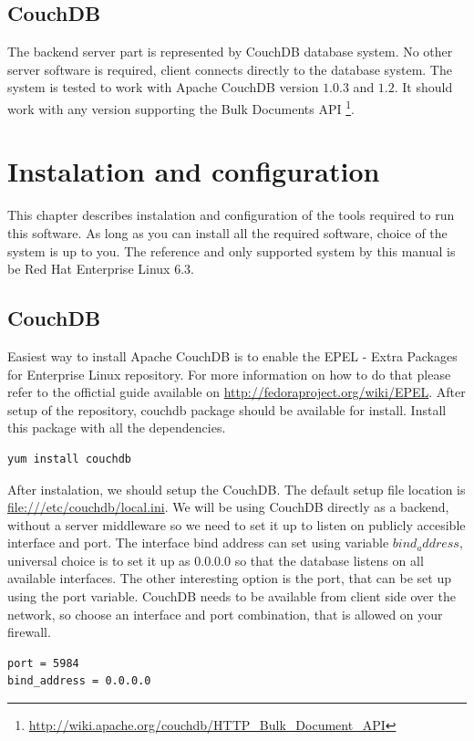 \documentclass[10pt,a4paper,oneside]{report}
\begin{document}
\section{CouchDB}
The backend server part is represented by CouchDB database system. No other
server software is required, client connects directly to the database system.
The system is tested to work with Apache CouchDB version $1.0.3$ and $1.2$. It
should work with any version supporting the Bulk Documents API
\footnote{\url{http://wiki.apache.org/couchdb/HTTP_Bulk_Document_API}}.





\chapter{Instalation and configuration}
This chapter describes instalation and configuration of the tools required to
run this software. As long as you can install all the required software,
choice of the system is up to you. The reference and only supported system by
this manual is be Red Hat Enterprise Linux 6.3.

\section{CouchDB}
Easiest way to install Apache CouchDB is to enable the EPEL - Extra Packages for
Enterprise Linux repository. For more information on how to do that please refer
to the offictial guide available on \url{http://fedoraproject.org/wiki/EPEL}.
After setup of the repository, couchdb package should be available for install.
Install this package with all the dependencies.
\begin{verbatim}
yum install couchdb
\end{verbatim}
After instalation, we should setup the CouchDB. The default setup file location
is \url{file:///etc/couchdb/local.ini}. We will be using CouchDB directly as a
backend, without a server middleware so we need to set it up to listen on
publicly accesible interface and port. The interface bind address can set using
variable $bind_address$, universal choice is to set it up as $0.0.0.0$ so that
the database listens on all available interfaces. The other interesting option is
the port, that can be set up using the port variable. CouchDB needs to be
available from client side over the network, so choose an interface and port combination, that is allowed on your firewall.

\begin{verbatim}
port = 5984
bind_address = 0.0.0.0
\end{verbatim}
\end{document}
